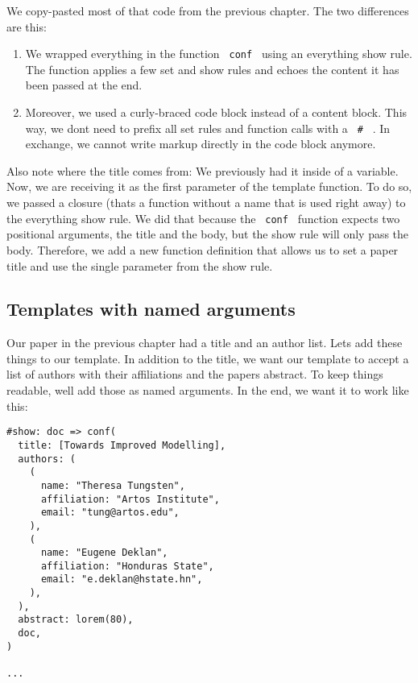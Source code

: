 We copy-pasted most of that code from the previous chapter. The two
differences are this:

\begin{enumerate}
\item
  We wrapped everything in the function \texttt{\ conf\ } using an
  everything show rule. The function applies a few set and show rules
  and echoes the content it has been passed at the end.
\item
  Moreover, we used a curly-braced code block instead of a content
  block. This way, we don\textquotesingle t need to prefix all set rules
  and function calls with a \texttt{\ \#\ } . In exchange, we cannot
  write markup directly in the code block anymore.
\end{enumerate}

Also note where the title comes from: We previously had it inside of a
variable. Now, we are receiving it as the first parameter of the
template function. To do so, we passed a closure (that\textquotesingle s
a function without a name that is used right away) to the everything
show rule. We did that because the \texttt{\ conf\ } function expects
two positional arguments, the title and the body, but the show rule will
only pass the body. Therefore, we add a new function definition that
allows us to set a paper title and use the single parameter from the
show rule.

\subsection{Templates with named arguments}\label{named-arguments}

Our paper in the previous chapter had a title and an author list.
Let\textquotesingle s add these things to our template. In addition to
the title, we want our template to accept a list of authors with their
affiliations and the paper\textquotesingle s abstract. To keep things
readable, we\textquotesingle ll add those as named arguments. In the
end, we want it to work like this:

\begin{verbatim}
#show: doc => conf(
  title: [Towards Improved Modelling],
  authors: (
    (
      name: "Theresa Tungsten",
      affiliation: "Artos Institute",
      email: "tung@artos.edu",
    ),
    (
      name: "Eugene Deklan",
      affiliation: "Honduras State",
      email: "e.deklan@hstate.hn",
    ),
  ),
  abstract: lorem(80),
  doc,
)

...
\end{verbatim}


